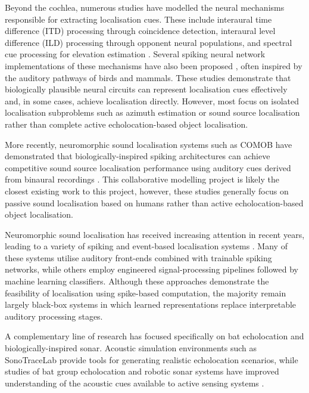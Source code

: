 Beyond the cochlea, numerous studies have modelled the neural mechanisms responsible for extracting localisation cues. These include interaural time difference (ITD) processing through coincidence detection, interaural level difference (ILD) processing through opponent neural populations, and spectral cue processing for elevation estimation \cite{Lazar2008FaithfulNeurons,Moro2022NeuromorphicTransducers,Tanveer2021EstimateStudy,OssesVecchiAProcessing}. Several spiking neural network implementations of these mechanisms have also been proposed \cite{Wall2012SpikingDifference,Goldsworthy2022ComputationalStimulation,Biswas2022ModelingOscillators}, often inspired by the auditory pathways of birds and mammals. These studies demonstrate that biologically plausible neural circuits can represent localisation cues effectively and, in some cases, achieve localisation directly. However, most focus on isolated localisation subproblems such as azimuth estimation or sound source localisation rather than complete active echolocation-based object localisation. 

More recently, neuromorphic sound localisation systems such as COMOB have demonstrated that biologically-inspired spiking architectures can achieve competitive sound source localisation performance using auditory cues derived from binaural recordings \cite{SpikingProject, Dalmas2024ASystems}. This collaborative modelling project is likely the closest existing work to this project, however, these studies generally focus on passive sound localisation based on humans rather than active echolocation-based object localisation.

Neuromorphic sound localisation has received increasing attention in recent years, leading to a variety of spiking and event-based localisation systems \cite{Dalmas2024ASystems}. Many of these systems utilise auditory front-ends combined with trainable spiking networks, while others employ engineered signal-processing pipelines followed by machine learning classifiers. Although these approaches demonstrate the feasibility of localisation using spike-based computation, the majority remain largely black-box systems in which learned representations replace interpretable auditory processing stages.

A complementary line of research has focused specifically on bat echolocation and biologically-inspired sonar. Acoustic simulation environments such as SonoTraceLab \cite{Jansen2024SonoTraceLabBats} provide tools for generating realistic echolocation scenarios, while studies of bat group echolocation and robotic sonar systems have improved understanding of the acoustic cues available to active sensing systems \cite{Mazar2026Agent-basedEmergences,Schillebeeckx2011BiomimeticPinnae}.

